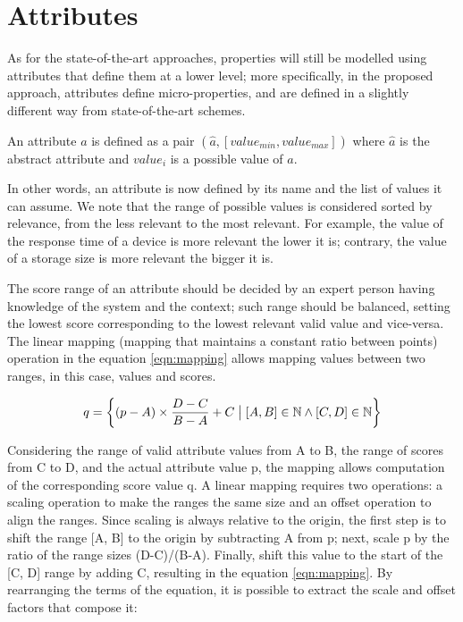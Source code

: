 \section{Attributes}
As for the state-of-the-art approaches, properties will still be modelled using attributes that define them at a lower level; more specifically, in the proposed approach, attributes define micro-properties, and are defined in a slightly different way from state-of-the-art schemes. 

\begin{defn}
An attribute \(a\) is defined as a pair \((\hat{a}, [value_{min}, value_{max}])\) where \(\hat{a}\) is the abstract attribute and \(value_{i}\) is a possible value of \(a\). 
\end{defn}

In other words, an attribute is now defined by its name and the list of values it can assume. We note that the range of possible values is considered sorted by relevance, from the less relevant to the most relevant. For example, the value of the response time of a device is more relevant the lower it is; contrary, the value of a storage size is more relevant the bigger it is.

The score range of an attribute should be decided by an expert person having knowledge of the system and the context; such range should be balanced, setting the lowest score corresponding to the lowest relevant valid value and vice-versa.
The linear mapping (mapping that maintains a constant ratio between points) operation in the equation \ref{eqn:mapping} allows mapping values between two ranges, in this case, values and scores.

\begin{equation}
\label{eqn:mapping}
    q = \left \{ (p - A) \times \frac{D - C}{B - A} + C \bigm| [A, B] \in \mathbb{N} \wedge [C, D] \in \mathbb{N}  \right \}
\end{equation}

Considering the range of valid attribute values from A to B, the range of scores from C to D, and the actual attribute value p, the mapping allows computation of the corresponding score value q.
A linear mapping requires two operations: a scaling operation to make the ranges the same size and an offset operation to align the ranges. Since scaling is always relative to the origin, the first step is to shift the range [A, B] to the origin by subtracting A from p; next, scale p by the ratio of the range sizes (D-C)/(B-A). Finally, shift this value to the start of the [C, D] range by adding C, resulting in the equation \ref{eqn:mapping}. By rearranging the terms of the equation, it is possible to extract the scale and offset factors that compose it:

